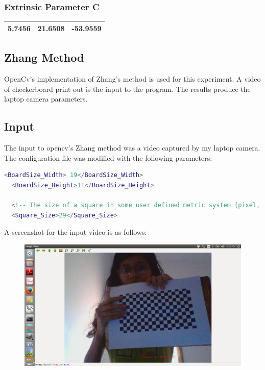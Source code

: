 \documentclass[12pt]{article}
\begin{document}
\subsubsection{Extrinsic Parameter C}
\begin{tabular}{|c|c|c|}
\hline
  5.7456  &
   21.6508 &
  -53.9559\\
 \hline
\end{tabular}

\subsection{Zhang Method}
OpenCv's implementation of Zhang's method is used for this experiment. A video of checkerboard print out is the input to the program. The results produce the laptop camera parameters.

\subsection{Input}
The input to opencv's Zhang method was a video captured by my laptop camera. The configuration file was modified with the following parameters:
\begin{lstlisting}[language=matlab]
<BoardSize_Width> 19</BoardSize_Width>
  <BoardSize_Height>11</BoardSize_Height>
  
  <!-- The size of a square in some user defined metric system (pixel, millimeter)-->
  <Square_Size>29</Square_Size>
  \end{lstlisting}
  
A screenshot for the input video is as follows:
\begin{figure}[htp]
\centering
\includegraphics[width=1\textwidth]{inputZhang.png}\hfill
\end{figure}
\clearpage
\end{document}
